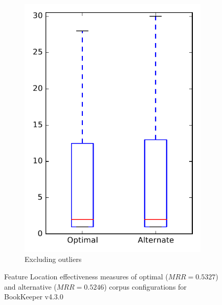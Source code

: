 \begin{figure}
\begin{subfigure}{.4\textwidth}
        \includegraphics[height=0.4\textheight]{figures/combo/flt_rq2_bookkeeper_no_outlier}
        \caption{Excluding outliers}\label{fig:combo:flt:rq2:bookkeeper_no_outlier}
    \end{subfigure}
\caption[Feature Location effectiveness measures of optimal and alternative corpus configurations for BookKeeper v4.3.0]%
{Feature Location effectiveness measures of optimal ($MRR=0.5327$) and alternative ($MRR=0.5246$) corpus configurations for BookKeeper v4.3.0}
\label{fig:combo:flt:rq2:bookkeeper}
\end{figure}
